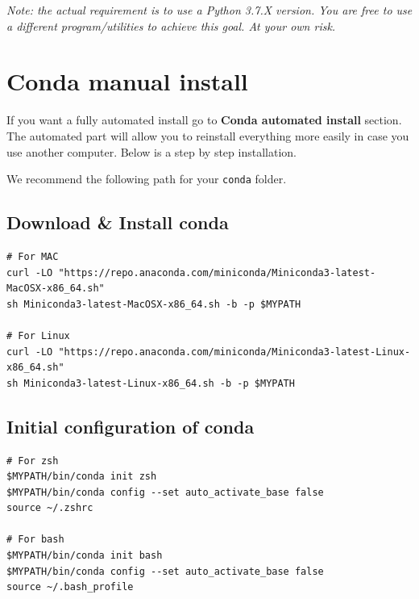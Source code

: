 \documentclass{42-en}
\begin{document}
\emph{Note: the actual requirement is to use a Python 3.7.X version. You are free to use a different program/utilities to achieve this goal. At your own risk.}

\section*{Conda manual install}

If you want a fully automated install go to \textbf{Conda automated install} section.
The automated part will allow you to reinstall everything more easily in case you use another computer. Below is a step by step installation.

We recommend the following path for your \texttt{conda} folder.



\subsection*{Download \& Install conda}
\begin{verbatim}
# For MAC
curl -LO "https://repo.anaconda.com/miniconda/Miniconda3-latest-MacOSX-x86_64.sh"
sh Miniconda3-latest-MacOSX-x86_64.sh -b -p $MYPATH

# For Linux
curl -LO "https://repo.anaconda.com/miniconda/Miniconda3-latest-Linux-x86_64.sh"
sh Miniconda3-latest-Linux-x86_64.sh -b -p $MYPATH
\end{verbatim}

\subsection*{Initial configuration of conda}
\begin{verbatim}
# For zsh
$MYPATH/bin/conda init zsh
$MYPATH/bin/conda config --set auto_activate_base false
source ~/.zshrc

# For bash
$MYPATH/bin/conda init bash
$MYPATH/bin/conda config --set auto_activate_base false
source ~/.bash_profile
\end{verbatim}
	
\end{document}

